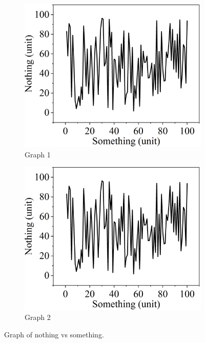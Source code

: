 \begin{figure}[H]
\begin{subfigure}{.45\linewidth}
  \includegraphics[width=\linewidth]{Graphs/placeholdergraph.png}
  \caption{Graph 1}
  \label{fig:1graph}
\end{subfigure}\hfill
\begin{subfigure}{.45\linewidth}
  \includegraphics[width=\linewidth]{Graphs/placeholdergraph.png}
  \caption{Graph 2}
  \label{fig:2graph}
\end{subfigure}
\caption{Graph of nothing vs something.}
\label{fig:graphs}
\end{figure}



